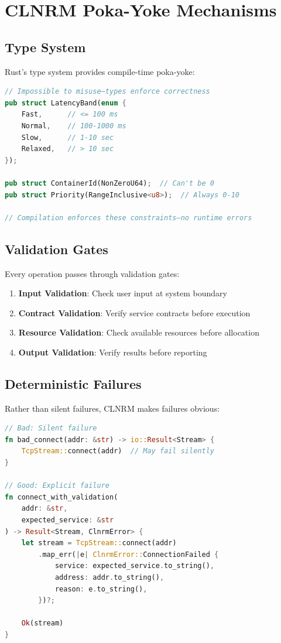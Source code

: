 \documentclass[12pt,twoside,openright]{book}
\theoremstyle{plain}
\theoremstyle{definition}
\theoremstyle{remark}
\begin{document}
\section{CLNRM Poka-Yoke Mechanisms}

\subsection{Type System}

Rust's type system provides compile-time poka-yoke:

\begin{lstlisting}[language=Rust, caption=Type-Safe Configuration]
// Impossible to misuse—types enforce correctness
pub struct LatencyBand(enum {
    Fast,      // <= 100 ms
    Normal,    // 100-1000 ms
    Slow,      // 1-10 sec
    Relaxed,   // > 10 sec
});

pub struct ContainerId(NonZeroU64);  // Can't be 0
pub struct Priority(RangeInclusive<u8>);  // Always 0-10

// Compilation enforces these constraints—no runtime errors
\end{lstlisting}

\subsection{Validation Gates}

Every operation passes through validation gates:

\begin{enumerate}
  \item \textbf{Input Validation}: Check user input at system boundary
  \item \textbf{Contract Validation}: Verify service contracts before execution
  \item \textbf{Resource Validation}: Check available resources before allocation
  \item \textbf{Output Validation}: Verify results before reporting
\end{enumerate}

\subsection{Deterministic Failures}

Rather than silent failures, CLNRM makes failures obvious:

\begin{lstlisting}[language=Rust, caption=Deterministic Error Handling]
// Bad: Silent failure
fn bad_connect(addr: &str) -> io::Result<Stream> {
    TcpStream::connect(addr)  // May fail silently
}

// Good: Explicit failure
fn connect_with_validation(
    addr: &str,
    expected_service: &str
) -> Result<Stream, ClnrmError> {
    let stream = TcpStream::connect(addr)
        .map_err(|e| ClnrmError::ConnectionFailed {
            service: expected_service.to_string(),
            address: addr.to_string(),
            reason: e.to_string(),
        })?;

    Ok(stream)
}
\end{lstlisting}
\end{document}
